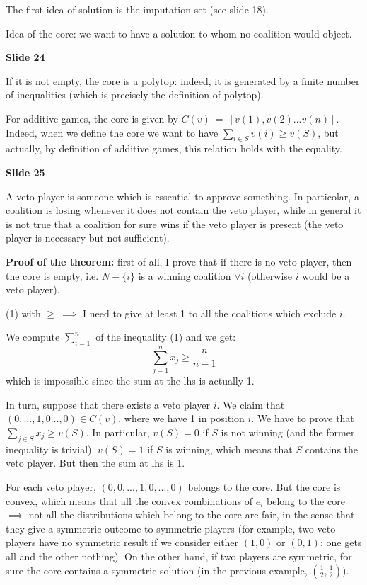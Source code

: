 \documentclass[pt11,a4paper,twoside,reqno,openright]{paper}
\begin{document}
\noindent The first idea of solution is the imputation set (see slide 18).


\noindent Idea of the core: we want to have a solution to whom no coalition 
would object.

\bigskip
\noindent \textbf{Slide 24}

\noindent If it is not empty, the core is a polytop: indeed, it is generated by 
a finite number of inequalities (which is precisely the definition of polytop).

\noindent For additive games, the core is given by $C(v)~=~[v(1),v(2)...v(n)]$. 
Indeed, when we define the core we want to have 
$\sum_{i \in S}{v(i)} \geq v(S)$, but actually, by definition of additive 
games, this relation holds with the equality.

\bigskip
\noindent \textbf{Slide 25}

\noindent A veto player is someone which is essential to approve something. In 
particolar, a coalition is losing whenever it does not contain the veto player, 
while in general it is not true that a coalition for sure wins if the veto 
player is present (the veto player is necessary but not sufficient).

\noindent \textbf{Proof of the theorem:} first of all, I prove that if there is 
no veto player, then the core is empty, i.e. $N-\{i\}$ is a winning coalition 
$\forall i$ (otherwise $i$ would be a veto player).

\noindent (1) with $\geq~\implies$ I need to give at least 1 to all the 
coalitions which exclude $i$.

\noindent We compute $\sum_{i=1}^n$ of the inequality (1) and we get:
\[
	\sum_{j=1}^n{x_j} \geq \frac{n}{n-1}
\]
which is impossible since the sum at the lhs is actually 1.

\noindent In turn, suppose that there exists a veto player $i$. We claim that 
$(0,...,1,0...,0) \in C(v)$, where we have 1 in position $i$. We have to prove 
that $\sum_{j \in S}{x_j} \geq v(S)$. In particular, $v(S)=0$ if $S$ is not 
winning (and the former inequality is trivial). $v(S)=1$ if $S$ is winning, 
which means that $S$ contains the veto player. But then the sum at lhs is 1.

\noindent For each veto player, $(0,0,...,1,0,...,0)$ belongs to the core. But 
the core is convex, which means that all the convex combinations of $e_i$ 
belong to the core $\implies$ not all the distributions which belong to the 
core are fair, in the sense that they give a symmetric outcome to symmetric 
players (for example, two veto players have no symmetric result if we consider 
either $(1,0)$ or $(0,1)$: one gets all and the other nothing). On the other 
hand, if two players are symmetric, for sure the core contains a symmetric 
solution (in the previous example, $(\frac{1}{2},\frac{1}{2})$). 
\end{document}
